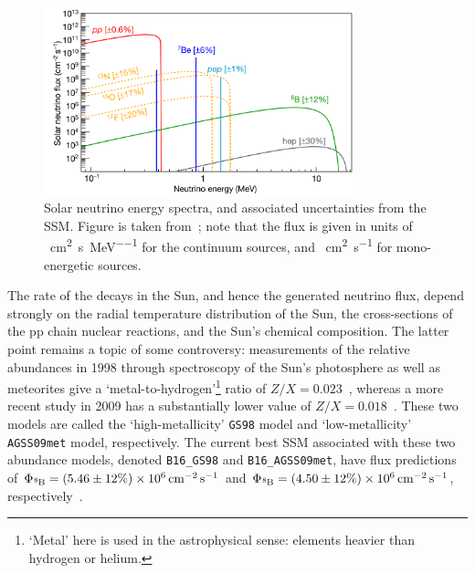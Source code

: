 \begin{figure}
    \centering
    \includegraphics[width=0.8\textwidth]{1_NeutrinoTheory/Figs/solar_nu_energy_spec_SSM.png}
    \caption[Solar neutrino energy spectrum, and associated uncertainties from the SMM]
    {Solar neutrino energy spectra, and associated uncertainties from the SSM. Figure is taken from~\cite{agostiniComprehensiveMeasurementPpchain2018,vinyolesB16StandardSolar2018}; note that the flux is given in units of \si{\per\cm\squared\per\second\per\MeV} for the continuum sources, and \si{\per\cm\squared\per\second} for mono-energetic sources.}
    \label{fig:ssm_neutrino_spectra}
\end{figure}

The rate of the \beight{} decays in the Sun, and hence the generated neutrino flux, depend strongly on the radial temperature distribution of the Sun, the cross-sections of the pp chain nuclear reactions, and the Sun's chemical composition. The latter point remains a topic of some controversy: measurements of the relative abundances in 1998 through spectroscopy of the Sun's photosphere as well as meteorites give a `metal-to-hydrogen'\footnote{`Metal' here is used in the astrophysical sense: elements heavier than hydrogen or helium.} ratio of $Z/X = 0.023$~\cite{grevesseStandardSolarComposition1998}, whereas a more recent study in 2009 has a substantially lower value of $Z/X = 0.018$~\cite{asplundChemicalCompositionSun2009}.
These two models are called the `high-metallicity' \texttt{GS98} model and `low-metallicity' \texttt{AGSS09met} model, respectively. The current best SSM associated with these two abundance models, denoted \texttt{B16\_GS98} and \texttt{B16\_AGSS09met}, have \beight{} flux predictions of $\Phi_{\beight{}} = (5.46\pm12\%)\times 10^{6}\,\si{\per\cm\squared\per\second}$ and $\Phi_{\beight{}} = (4.50\pm12\%)\times 10^{6}\,\si{\per\cm\squared\per\second}$, respectively~\cite{vinyolesB16StandardSolar2018}.

